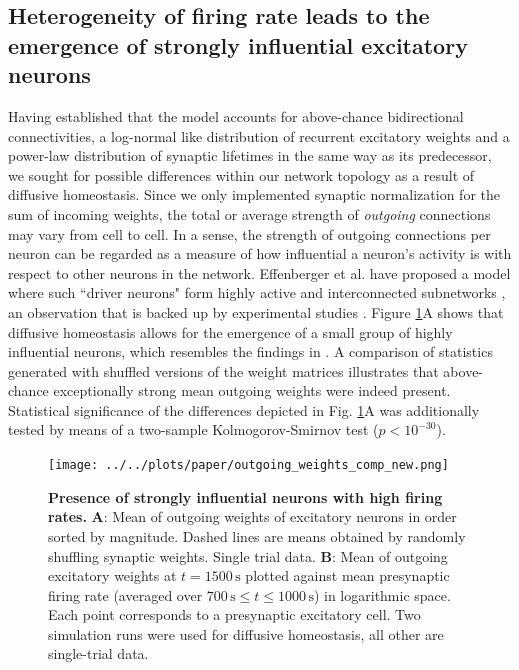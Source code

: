 \documentclass[10pt,letterpaper]{article}
\begin{document}
\subsection*{Heterogeneity of firing rate leads to the emergence of strongly influential excitatory neurons}\label{Section_Mean_outgoing_Weights}
Having established that the model accounts for above-chance bidirectional connectivities, a log-normal like distribution of recurrent excitatory weights and a power-law distribution of synaptic lifetimes in the same way as its predecessor, we sought for possible differences within our network topology as a result of diffusive homeostasis. Since we only implemented synaptic normalization for the sum of incoming weights, the total or average strength of \emph{outgoing} connections may vary from cell to cell. In a sense, the strength of outgoing connections per neuron can be regarded as a measure of how influential a neuron's activity is with respect to other neurons in the network. Effenberger et al. have proposed a model where such ``driver neurons" form highly active and interconnected subnetworks \cite{Effenberger_2015}, an observation that is backed up by experimental studies \cite{Yassin_Subnetworks_2010,Eckmann_Leader_Neurons_2008}. Figure \ref{Outgoing_Weights_Comp}A shows that diffusive homeostasis allows for the emergence of a small group of highly influential neurons, which resembles the findings in \cite{Effenberger_2015}. A comparison of statistics generated with shuffled versions of the weight matrices illustrates that above-chance exceptionally strong mean outgoing weights were indeed present. Statistical significance of the differences depicted in Fig. \ref{Outgoing_Weights_Comp}A was additionally tested by means of a two-sample Kolmogorov-Smirnov test ($p < 10^{-30}$).

\begin{figure}
\texttt{[image: ../../plots/paper/outgoing\_weights\_comp\_new.png]}
\caption{{\bf Presence of strongly influential neurons with high firing rates.} \textbf{A}: Mean of outgoing weights of excitatory neurons in order sorted by magnitude. Dashed lines are means obtained by randomly shuffling synaptic weights. Single trial data. \textbf{B}: Mean of outgoing excitatory weights at $t=\mathrm{1500\,s}$ plotted against mean presynaptic firing rate (averaged over $\mathrm{700\,s \leq} t \mathrm{ \leq 1000\,s}$) in logarithmic space. Each point corresponds to a presynaptic excitatory cell. Two simulation runs were used for diffusive homeostasis, all other are single-trial data.}
\label{Outgoing_Weights_Comp}
\end{figure}
\end{document}
